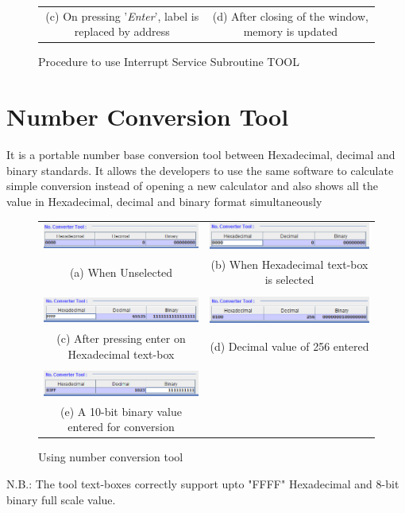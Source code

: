 \begin{figure}[htbp]
{\begin{tabular}{cc}
			(c) On pressing '\textit{Enter}', label is replaced by address & (d) After closing of the window, memory is updated
	\end{tabular}
}
\caption{Procedure to use Interrupt Service Subroutine TOOL}
\label{fig:isr_routine}
\end{figure}

\newpage
\section{Number Conversion Tool}
It is a portable number base conversion tool between Hexadecimal, decimal and binary standards. It allows the developers to use the same software to calculate simple conversion instead of opening a new calculator and also shows all the value in Hexadecimal, decimal and binary format simultaneously

\begin{figure}[htbp]
	\centering
	{\def\arraystretch{2}
		\begin{tabular}{cc}
			\includegraphics[width=0.5\linewidth]{no_tool} &  \includegraphics[width=0.5\linewidth]{no_tool_select}\\
			(a) When Unselected & (b) When Hexadecimal text-box is selected\\\\
			\includegraphics[width=0.5\linewidth]{no_tool_value} &
			\includegraphics[width=0.5\linewidth]{no_tool_value_dec}\\
			(c) After pressing enter on Hexadecimal text-box & (d) Decimal value of 256 entered\\\\
			\includegraphics[width=0.5\linewidth]{no_tool_bin} &
			\\
			(e) A 10-bit binary value entered for conversion &
		\end{tabular}	
	}
\caption{Using number conversion tool}
\end{figure}
 
 N.B.: The tool text-boxes correctly support upto "FFFF" Hexadecimal and 8-bit binary full scale value.